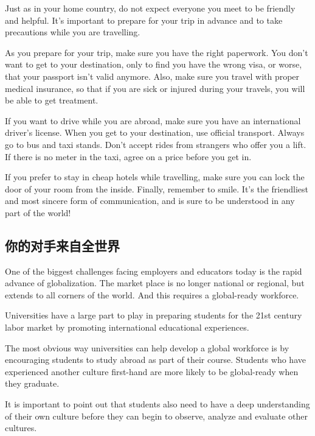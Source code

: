 Just as in your home country, do not expect everyone you
meet to be friendly and helpful. It's important to prepare
for your trip in advance and to take precautions while you
are travelling.

As you prepare for your trip, make sure you have the
right paperwork. You don't want to get to your destination,
only to find you have the wrong visa, or worse, that your
passport isn't valid anymore. Also, make sure you travel
with proper medical insurance, so that if you are sick or injured
during your travels, you will be able to get treatment.

If you want to drive while you are abroad, make sure you
have an international driver's license. When you get
to your destination, use official transport. Always go to bus
and taxi stands. Don't accept rides from strangers who
offer you a lift. If there is no meter in the taxi, agree on a
price before you get in.

If you prefer to stay in cheap hotels while travelling, make
sure you can lock the door of your room from the inside.
Finally, remember to smile. It's the friendliest and most sincere
form of communication, and is sure to be understood
in any part of the world!




\subsection{你的对手来自全世界}
\begin{margintable}\vspace{-2cm}\footnotesize
\end{margintable}
One of the biggest challenges facing employers and
educators today is the rapid advance of globalization. The
market place is no longer national or regional, but extends
to all corners of the world. And this requires a global-ready
workforce.

Universities have a large part to play in preparing students
for the 21st century labor market by promoting international
educational experiences.

The most obvious way universities can help develop a
global workforce is by encouraging students to study
abroad as part of their course. Students who have 
experienced another culture first-hand are more likely to be
global-ready when they graduate.

It is important to point out that students also need to
have a deep understanding of their own culture before
they can begin to observe, analyze and evaluate other
cultures.

